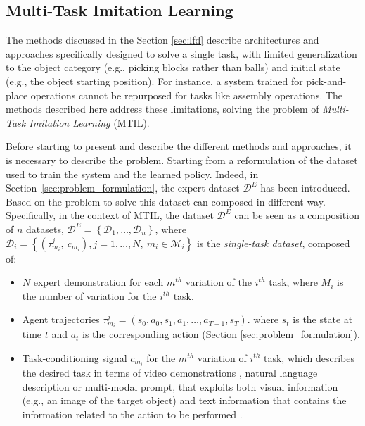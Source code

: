 \subsection{Multi-Task Imitation Learning}
\label{sec:occp_mtil}
The methods discussed in the Section \ref{sec:lfd} describe architectures and approaches specifically designed to solve a single task, with limited generalization to the object category (e.g., picking blocks rather than balls) and initial state (e.g., the object starting position). For instance, a system trained for pick-and-place operations cannot be repurposed for tasks like assembly operations. The methods described here address these limitations, solving the problem of \textit{Multi-Task Imitation Learning} (MTIL).

Before starting to present and describe the different methods and approaches, it is necessary to describe the problem. Starting from a reformulation of the dataset used to train the system and the learned policy.
Indeed, in Section~\ref{sec:problem_formulation}, the expert dataset $\mathcal{D}^{E}$ has been introduced. Based on the problem to solve this dataset can composed in different way. Specifically, in the context of MTIL, the dataset $\mathcal{D}^{E}$ can be seen as a composition of $n$ datasets, $\mathcal{D}^{E}=\left \{\mathcal{D}_{1}, \dots, \mathcal{D}_{n}\right \}$, where $\mathcal{D}_{i} = \left \{ (\tau_{m_{i}}^{j}, \ c_{m_{i}}), j=1,\dots,N, \ m_{i} \in \mathcal{M}_{i}\right \}$ is the \textit{single-task dataset}, composed of:
\begin{itemize}
    \item $N$ expert demonstration for each $m^{th}$ variation of the $i^{th}$ task, where $M_{i}$ is the number of variation for the $i^{th}$ task.
    \item Agent trajectories $\tau_{m_{i}}^{j} = (s_{0}, a_{0}, s_{1}, a_{1}, \dots, a_{T-1}, s_{T})$. where $s_{t}$ is the state at time $t$ and $a_{t}$ is the corresponding action (Section \ref{sec:problem_formulation}).
    \item Task-conditioning signal $c_{m_{i}}$ for the $m^{th}$ variation of $i^{th}$ task, which describes the desired task in terms of video demonstrations \cite{james2018task_embedded,bhutani2022attentive_one_shot,dasari2021transformers_one_shot,mandi2022towards_more_generalizable_one_shot}, natural language description \cite{stepputtis2020language,jang2022bc_z,mees2022calvin,doasIcan2022,mees2022hulc,brohan2022rt,shridhar2023perceiver} or multi-modal prompt, that exploits both visual information (e.g., an image of the target object) and text information that contains the information related to the action to be performed \cite{jiang2023vima}.
\end{itemize}
